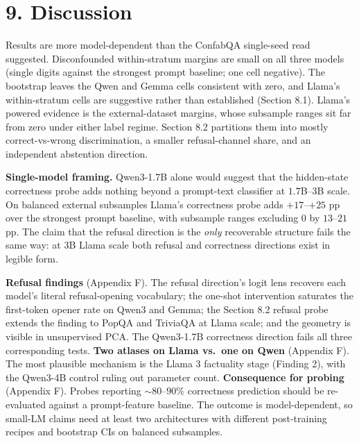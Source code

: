 \section{9. Discussion}\label{discussion}

Results are more model-dependent than the ConfabQA single-seed read suggested. Disconfounded within-stratum margins are small on all three models (single digits against the strongest prompt baseline; one cell negative). The bootstrap leaves the Qwen and Gemma cells
consistent with zero, and Llama's within-stratum cells are suggestive
rather than established (Section 8.1). Llama's powered evidence is the
external-dataset margins, whose subsample ranges sit far from zero under either label
regime. Section 8.2 partitions them into mostly correct-vs-wrong discrimination, a smaller refusal-channel share, and an independent abstention direction.

\textbf{Single-model framing.} Qwen3-1.7B alone would suggest that the hidden-state correctness probe adds nothing beyond a prompt-text classifier at \(1.7\)B--\(3\)B scale. On balanced external subsamples Llama's correctness probe
adds \(+17\)--\(+25\) pp over the strongest prompt baseline, with subsample
ranges excluding \(0\) by \(13\)--\(21\) pp. The claim that the refusal direction is the \emph{only} recoverable structure fails the
same way: at \(3\)B Llama scale both refusal and correctness directions
exist in legible form.

\textbf{Refusal findings} (Appendix F). The refusal direction's logit lens recovers each model's literal refusal-opening vocabulary; the one-shot intervention saturates the first-token opener rate on Qwen3 and Gemma; the Section 8.2 refusal probe extends the finding to PopQA and TriviaQA at Llama scale; and the geometry is visible in unsupervised PCA. The Qwen3-1.7B correctness
direction fails all three corresponding tests. \textbf{Two atlases on Llama vs.~one on Qwen} (Appendix F). The most plausible mechanism is
the Llama 3 factuality stage (Finding 2), with the Qwen3-4B
control ruling out parameter count. \textbf{Consequence for probing} (Appendix F). Probes reporting \(\sim 80\)--\(90\%\) correctness
prediction should be re-evaluated against a prompt-feature baseline. The outcome is model-dependent, so small-LM claims need at
least two architectures with different post-training recipes and
bootstrap CIs on balanced subsamples.
